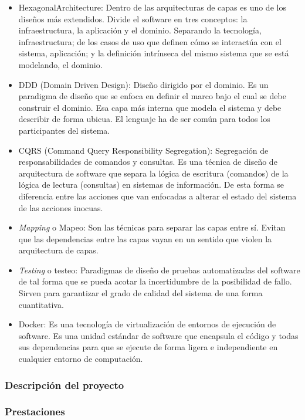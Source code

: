 \begin{itemize}
    \item \gls{HexagonalArchitecture}: Dentro de las arquitecturas de capas es uno de los diseños más extendidos.
    Divide el software en tres conceptos: la infraestructura, la aplicación y el dominio.
    Separando la tecnología, infraestructura;
    de los casos de uso que definen cómo se interactúa con el sistema, aplicación;
    y la definición intrínseca del mismo sistema que se está modelando, el dominio.
    \item \gls{DDD} (Domain Driven Design): Diseño dirigido por el dominio.
    Es un paradigma de diseño que se enfoca en definir el marco bajo el cual se debe construir el dominio.
    Esa capa más interna que modela el sistema y debe describir de forma ubicua.
    El lenguaje ha de ser común para todos los participantes del sistema.
    \item \gls{CQRS} (Command Query Responsibility Segregation): Segregación de responsabilidades de comandos y consultas.
    Es una técnica de diseño de arquitectura de software que separa la lógica de escritura (comandos) de la lógica de lectura (consultas) en sistemas de información.
    De esta forma se diferencia entre las acciones que van enfocadas a alterar el estado del sistema de las acciones inocuas.
    \item \textit{Mapping} o Mapeo:
    Son las técnicas para separar las capas entre sí.
    Evitan que las dependencias entre las capas vayan en un sentido que violen la arquitectura de capas.
    \item \textit{Testing} o testeo:
    Paradigmas de diseño de pruebas automatizadas del software de tal forma que se pueda acotar la incertidumbre de la posibilidad de fallo.
    Sirven para garantizar el grado de calidad del sistema de una forma cuantitativa.
    \item Docker:
    Es una tecnología de virtualización de entornos de ejecución de software.
    Es una unidad estándar de software que encapsula el código y todas sus dependencias para que se ejecute de forma ligera e independiente en cualquier entorno de computación.
\end{itemize}



\subsubsection{Descripción del proyecto}


\subsubsection{Prestaciones}

